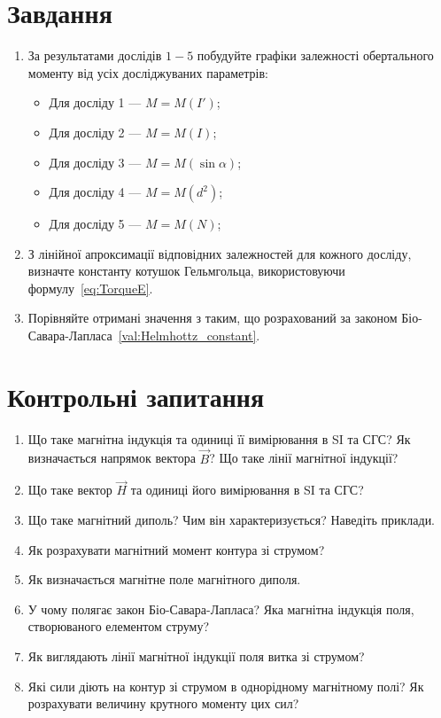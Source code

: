 \documentclass{LabWork}
\begin{document}
\section{Завдання}
\begin{enumerate}
	\item За результатами дослідів $1 - 5$ побудуйте графіки залежності обертального моменту від усіх досліджуваних параметрів:
	      \begin{itemize}
		      \item Для досліду 1 --- $M = M(I')$;
		      \item Для досліду 2 --- $M = M(I)$;
		      \item Для досліду 3 --- $M = M(\sin\alpha)$;
		      \item Для досліду 4 --- $M = M(d^2)$;
		      \item Для досліду 5 --- $M = M(N)$;
	      \end{itemize}
	\item З лінійної апроксимації відповідних залежностей для кожного досліду, визначте константу котушок Гельмгольца, використовуючи формулу~\eqref{eq:TorqueE}.
	\item Порівняйте отримані значення з таким, що розрахований за законом Біо-Савара-Лапласа~\eqref{val:Helmhottz_constant}.
\end{enumerate}

\section*{Контрольні запитання}

\begin{enumerate}
	\item Що таке магнітна індукція та одиниці її вимірювання в SI та СГС? Як визначається напрямок вектора $\vec{B}$? Що таке лінії магнітної індукції?
	\item Що таке вектор $\vec{H}$ та одиниці його вимірювання в SI та СГС?
	\item Що таке магнітний диполь? Чим він характеризується? Наведіть прик\-лади.
	\item Як розрахувати магнітний момент контура зі струмом?
	\item Як визначається магнітне поле магнітного диполя.
	\item У чому полягає закон Біо-Савара-Лапласа? Яка магнітна індукція поля, створюваного елементом струму?
	\item Як виглядають лінії магнітної індукції поля витка зі струмом?
	\item Які сили діють на контур зі струмом в однорідному магнітному полі? Як розрахувати величину крутного моменту цих сил?
\end{enumerate}
\end{document}
